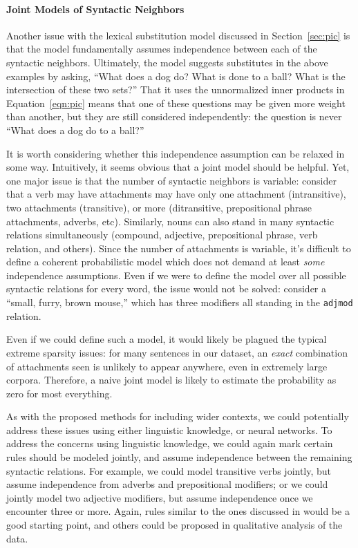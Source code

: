 \documentclass[12pt]{article}
\begin{document}
\paragraph{Joint Models of Syntactic Neighbors}

Another issue with the lexical substitution model discussed in Section~\ref{sec:pic}
is that the model fundamentally assumes independence between each of the syntactic
neighbors. Ultimately, the model suggests substitutes in the above examples by
asking, ``What does a dog do? What is done to a ball? What is the intersection
of these two sets?'' That it uses the unnormalized inner products in Equation~\ref{eqn:pic}
means that one of these questions may be given more weight than another, but they
are still considered independently: the question is never ``What does a dog do
to a ball?''

It is worth considering whether this independence assumption can be relaxed
in some way. Intuitively, it seems obvious that a joint model should be helpful.
Yet, one major issue is that the number of syntactic neighbors is variable:
consider that a verb may have attachments may have only one attachment (intransitive),
two attachments (transitive), or more (ditransitive, prepositional phrase attachments,
adverbs, etc). Similarly, nouns can also stand in many syntactic relations
simultaneously (compound, adjective, prepositional phrase, verb relation, and
others). Since the number of attachments is variable, it's difficult to define
a coherent probabilistic model which does not demand at least {\em some}
independence assumptions. Even if we were to define the model over all possible
syntactic relations for every word, the issue would not be solved: consider
a ``small, furry, brown mouse,'' which has three modifiers all standing
in the {\tt adjmod} relation.

Even if we could define such a model, it would likely be plagued the typical
extreme sparsity issues: for many sentences in our dataset, an {\em exact}
combination of attachments seen is unlikely to appear anywhere, even in
extremely large corpora. Therefore, a naive joint model is likely to estimate
the probability as zero for most everything.

As with the proposed methods for including wider contexts, we could potentially
address these issues using either linguistic knowledge, or neural networks.  To
address the concerns using linguistic knowledge, we could again mark certain
rules should be modeled jointly, and assume independence between the remaining
syntactic relations. For example, we could model transitive verbs jointly, but
assume independence from adverbs and prepositional modifiers; or we could
jointly model two adjective modifiers, but assume independence once we
encounter three or more. Again, rules similar to the ones discussed in
 would be a good starting point, and others could be
proposed in qualitative analysis of the data.
\end{document}
